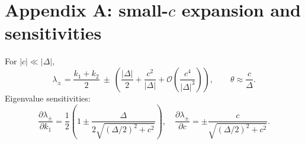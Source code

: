 \documentclass[11pt]{article}
\begin{document}
\section*{Appendix A: small-$c$ expansion and sensitivities}
\label{app:expansion}
For $|c|\ll |\Delta|$,
\begin{equation}
\lambda_{\pm}=\frac{k_1+k_2}{2}\ \pm\ \left(\frac{|\Delta|}{2}+\frac{c^2}{|\Delta|}+\mathcal{O}\!\left(\frac{c^4}{|\Delta|^3}\right)\right),\qquad
\theta\approx \frac{c}{\Delta}.
\end{equation}
Eigenvalue sensitivities:
\begin{equation}
\frac{\partial \lambda_{\pm}}{\partial k_1}=\frac12\left(1\pm \frac{\Delta}{2\sqrt{(\Delta/2)^2+c^2}}\right),\quad
\frac{\partial \lambda_{\pm}}{\partial c}=\pm \frac{c}{\sqrt{(\Delta/2)^2+c^2}}.
\end{equation}

\newpage



\end{document}
